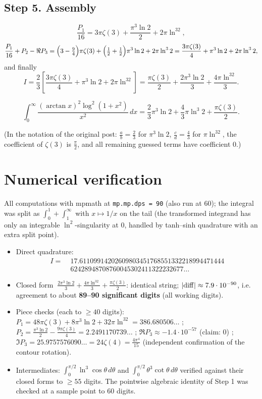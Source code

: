 \documentclass[11pt]{article}
\theoremstyle{remark}
\begin{document}
\subsection*{Step 5. Assembly}

\[
\frac{P_1}{16}=3\pi\zeta(3)+\frac{\pi^3\ln2}{2}+2\pi\ln^32,
\]
\[
\frac{P_1}{16}+P_2-\Re P_3
=\Bigl(3-\tfrac94\Bigr)\pi\zeta(3)+\Bigl(\tfrac12+\tfrac12\Bigr)\pi^3\ln2+2\pi\ln^32
=\frac{3\pi\zeta(3)}{4}+\pi^3\ln2+2\pi\ln^32 ,
\]
and finally
\[
I=\frac23\left[\frac{3\pi\zeta(3)}{4}+\pi^3\ln2+2\pi\ln^32\right]
=\frac{\pi\zeta(3)}{2}+\frac{2\pi^3\ln2}{3}+\frac{4\pi\ln^32}{3}.
\]

\[
\int_0^\infty\frac{(\arctan x)^2\log^2(1+x^2)}{x^2}\,dx
=\frac{2}{3}\pi^3\ln 2+\frac{4}{3}\pi\ln^3 2+\frac{\pi\zeta(3)}{2}.
\]

(In the notation of the original post: $\tfrac ab=\tfrac23$ for $\pi^3\ln2$, $\tfrac cd=\tfrac43$ for $\pi\ln^32$, the coefficient of $\zeta(3)$ is $\tfrac\pi2$, and all remaining guessed terms have coefficient $0$.)

\section*{Numerical verification}

All computations with mpmath at \texttt{mp.mp.dps = 90} (also run at 60); the integral was split as $\int_0^1+\int_1^\infty$ with $x\mapsto1/x$ on the tail (the transformed integrand has only an integrable $\ln^2$-singularity at $0$, handled by tanh--sinh quadrature with an extra split point).

\begin{itemize}
\item Direct quadrature:
\[
\begin{aligned}
I=\;&17.61109914202609803451768551332218994471444\\
&62428948708760045302411322232677\ldots
\end{aligned}
\]
\item Closed form $\ \frac{2\pi^3\ln2}{3}+\frac{4\pi\ln^32}{3}+\frac{\pi\zeta(3)}{2}$: identical string; $|{\rm diff}|\approx7.9\cdot10^{-90}$, i.e. agreement to about \textbf{89--90 significant digits} (all working digits).
\item Piece checks (each to $\ge40$ digits): $P_1=48\pi\zeta(3)+8\pi^3\ln2+32\pi\ln^32=386.680506\ldots$ \checkmark; $P_2=\frac{\pi^3\ln2}{2}-\frac{9\pi\zeta(3)}{4}=2.2491170739\ldots$ \checkmark; $\Re P_3\approx-1.4\cdot10^{-57}$ (claim: $0$) \checkmark; $\Im P_3=25.9757576090\ldots=24\zeta(4)=\tfrac{4\pi^4}{15}$ \checkmark (independent confirmation of the contour rotation).
\item Intermediates: $\int_0^{\pi/2}\ln^3\cos\theta\,d\theta$ and $\int_0^{\pi/2}\theta^3\cot\theta\,d\theta$ verified against their closed forms to $\ge55$ digits. The pointwise algebraic identity of Step 1 was checked at a sample point to $60$ digits.
\end{itemize}
\end{document}
